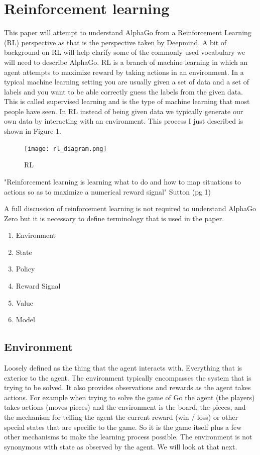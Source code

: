 \section{Reinforcement learning}

This paper will attempt to understand AlphaGo from a Reinforcement Learning (RL) perspective as that is the perspective taken by Deepmind. A bit of background on RL will help clarify some of the commonly used vocabulary we will need to describe AlphaGo. RL is a branch of machine learning in which an agent attempts to maximize reward by taking actions in an environment. In a typical machine learning setting you are usually given a set of data and a set of labels and you want to be able correctly guess the labels from the given data. This is called supervised learning and is the type of machine learning that most people have seen. In RL instead of being given data we typically generate our own data by interacting with an environment. This process I just described is shown in Figure 1. 

    \begin{figure}[h!]
        \centering
        \texttt{[image: rl\_diagram.png]}
        \caption{RL}
        \label{fig:my_label}
    \end{figure}


"Reinforcement learning is learning what to do and how to map situations to actions so as to maximize a numerical reward signal" Sutton (pg 1)

A full discussion of reinforcement learning is not required to understand AlphaGo Zero but it is necessary to define terminology that is used in the paper. 

    \begin{enumerate}
        \item Environment
        \item State
        \item Policy
        \item Reward Signal 
        \item Value
        \item Model
    \end{enumerate}
    
    \subsection{Environment}
    
    Loosely defined as the thing that the agent interacts with. Everything that is exterior to the agent. The environment typically encompasses the system that is trying to be solved. It also provides observations and rewards as the agent takes actions. For example when trying to solve the game of Go the agent (the players) takes actions (moves pieces) and the environment is the board, the pieces, and the mechanism for telling the agent the current reward (win / loss) or other special states that are specific to the game. So it is the game itself plus a few other mechanisms to make the learning process possible. The environment is not synonymous with state as observed by the agent. We will look at that next. 
    
